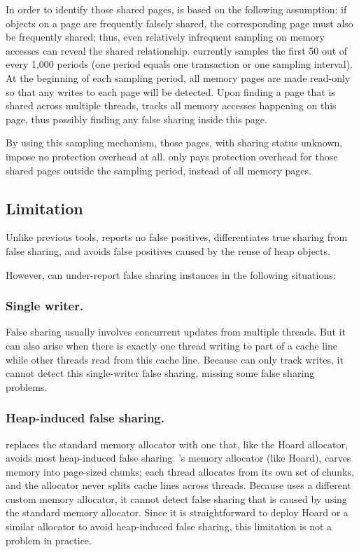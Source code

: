 In order to identify those shared pages, \SheriffDetect{} is based on the following assumption: if objects on a page are frequently falsely shared, the corresponding page must also be frequently shared; thus, even relatively infrequent sampling on memory accesses can reveal the shared relationship. \SheriffDetect{} currently samples the first 50 out of every 1,000 periods (one period equals one transaction or one sampling interval). At the beginning of each sampling period, all memory pages are made read-only so that any
writes to each page will be detected. Upon finding a page that is shared across multiple threads, \SheriffDetect{} tracks all memory accesses happening on this page, thus possibly finding any false sharing inside this page. 

By using this sampling mechanism, those pages, with sharing status unknown, impose no protection overhead at all. \sheriffDetect{} only pays protection overhead for those shared pages outside the sampling period, instead of all memory pages. 

\subsection{Limitation}
\label{discussion:faultofdetect}

Unlike previous tools, \SheriffDetect{} reports no false positives, differentiates true sharing from false sharing, and avoids false positives caused by the reuse of heap objects. 

However, \SheriffDetect{} can under-report false sharing instances in the following situations:

\subsubsection{Single writer.}
False sharing usually involves concurrent updates from multiple threads. But it can also arise when there is exactly one thread writing to part of a cache line while other threads read from this cache line. 
Because \sheriffdetect{} can only track writes, it cannot detect this single-writer false sharing, missing some false sharing problems. 

\subsubsection{Heap-induced false sharing.}  
\sheriff{} replaces the standard memory allocator with one that, like the Hoard allocator, avoids most heap-induced false sharing. \sheriff{}'s memory allocator (like Hoard), carves memory into page-sized chunks; each thread allocates from its own set of chunks, and the allocator never splits cache lines across threads. Because \SheriffDetect{} uses a different custom memory allocator, it cannot detect false sharing that is caused by using the standard memory allocator. Since it is straightforward to deploy Hoard or a similar allocator to avoid heap-induced false sharing, this limitation is not a problem in practice.

